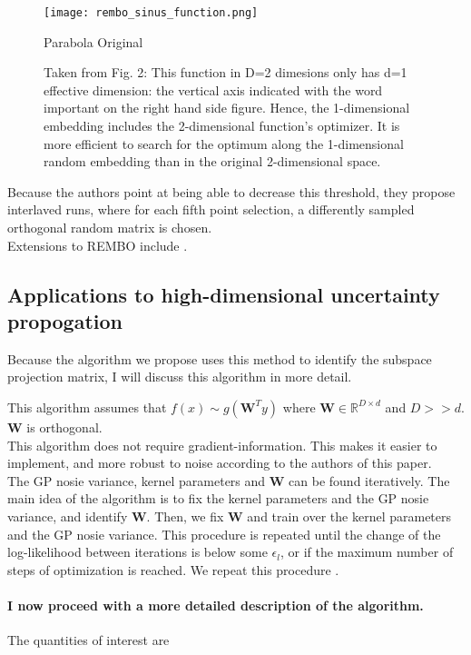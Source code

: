 \documentclass[a4paper,12pt,twoside,openright]{report}
\begin{document}
\begin{figure}[H]
    \centering
        \texttt{[image: rembo\_sinus\_function.png]}
        \caption{Parabola Original}
        \label{fig:gull}
    \caption{
    Taken from \citep{Wang2013} Fig. 2: This function in D=2 dimesions only has d=1 effective dimension: the vertical axis indicated with the word important on the right hand side figure. 
    Hence, the 1-dimensional embedding includes the 2-dimensional function’s optimizer. 
    It is more efficient to search for the optimum along the 1-dimensional random embedding than in the original 2-dimensional space.
    }\label{fig:animals}
\end{figure}

Because the authors point at being able to decrease this threshold, they propose interlaved runs, where for each fifth point selection, a differently sampled orthogonal random matrix is chosen. \\

Extensions to REMBO include \citep{RemboExtension}.

\subsection{Applications to high-dimensional uncertainty propogation}
Because the algorithm we propose uses this method to identify the subspace projection matrix, I will discuss this algorithm in more detail.

\citep{Tripathy} This algorithm assumes that  $f(x) \sim g( \mathbf{W}^T y)$ where $ \mathbf{W} \in \mathbb{R}^{D \times d} $ and $D >> d$.
$ \mathbf{W} $ is orthogonal. \\

This algorithm does not require gradient-information.
This makes it easier to implement, and more robust to noise according to the authors of this paper. \\
The GP nosie variance, kernel parameters and  $ \mathbf{W} $ can be found iteratively.
The main idea of the algorithm is to fix the kernel parameters and the GP nosie variance, and identify $ \mathbf{W} $.
Then, we fix $ \mathbf{W} $ and train over the kernel parameters and the GP nosie variance.
This procedure is repeated until the change of the log-likelihood between iterations is below some $ \epsilon_l $, or if the maximum number of steps of optimization is reached.
We repeat this procedure .\\

\paragraph{I now proceed with a more detailed description of the algorithm.}
The quantities of interest are
\end{document}
